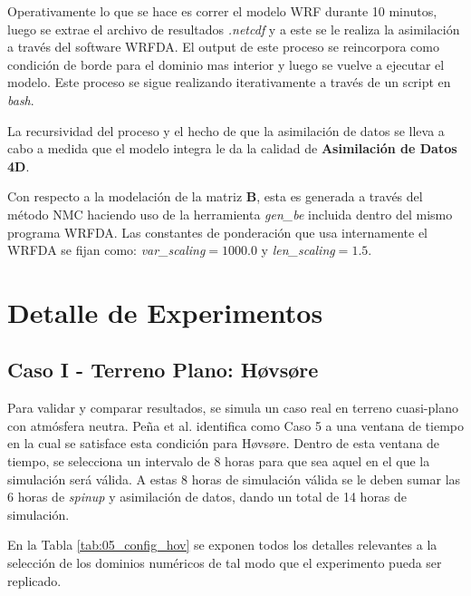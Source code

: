 Operativamente lo que se hace es correr el modelo WRF durante 10 minutos, luego se extrae el archivo de resultados \emph{.netcdf} y a este se le realiza la asimilación a través del software WRFDA. El output de este proceso se reincorpora como condición de borde para el dominio mas interior y luego se vuelve a ejecutar el modelo. Este proceso se sigue realizando iterativamente a través de un script en \emph{bash}.

La recursividad del proceso y el hecho de que la asimilación de datos se lleva a cabo a medida que el modelo integra le da la calidad de \textbf{Asimilación de Datos 4D}.

Con respecto a la modelación de la matriz $\textbf{B}$, esta es generada a través del método NMC \cite{https://doi.org/10.5065/d68s4mvh} haciendo uso de la herramienta \emph{gen\_be} incluida dentro del mismo programa WRFDA. Las constantes de ponderación que usa internamente el WRFDA se fijan como: \emph{var\_scaling}$=1000.0$ y \emph{len\_scaling}$=1.5$.
\newpage
\section{Detalle de Experimentos}
\subsection{Caso I - Terreno Plano: Høvsøre}
Para validar y comparar resultados, se simula un caso real en terreno cuasi-plano con atmósfera neutra. Peña et al. \cite{Pea2013} identifica como Caso 5 a una ventana de tiempo en la cual se satisface esta condición para Høvsøre. Dentro de esta ventana de tiempo, se selecciona un intervalo de 8 horas para que sea aquel en el que la simulación será válida. A estas 8 horas de simulación válida se le deben sumar las 6 horas de \emph{spinup} y asimilación de datos, dando un total de 14 horas de simulación.

En la Tabla \ref{tab:05_config_hov} se exponen todos los detalles relevantes a la selección de los dominios numéricos de tal modo que el experimento pueda ser replicado.

